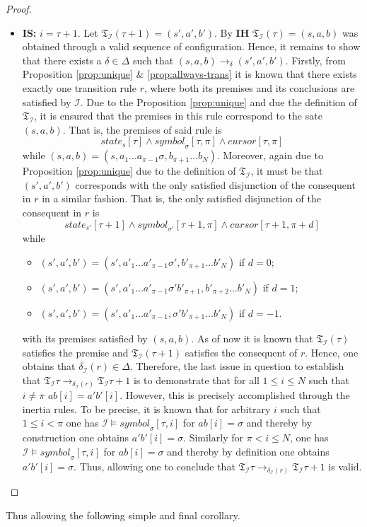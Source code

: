 \documentclass [11pt]{article}
\newcommand{\sym}[3]{\textit{symbol}_{#1}[#2,#3]}
\newcommand{\cursor}[2]{\textit{cursor}[#1,#2]}
\newcommand{\state}[2]{\textit{state}_{#1}[#2]}
\newcommand{\trans}[1]{\mathfrak{T}_{\mathcal{#1}}}
\begin{document}
\begin{proof}
\begin{itemize}
\item \textbf{IS:} $i=\tau+1$. Let $\trans{I}(\tau+1)=(s',a',b')$. By \textbf{IH} $\trans{I}(\tau)=(s,a,b)$ was obtained through a valid sequence of configuration. Hence, it remains to show that there exists a $\delta \in \Delta$ such that 
$(s,a,b) \to_{\delta}(s',a',b')$. Firstly, from Proposition \ref{prop:unique} \& \ref{prop:allways-trans} it is known that there exists exactly one transition rule $r$, where both its premises and its conclusions are satisfied by $\mathcal{I}$. Due to 
the Proposition \ref{prop:unique} and due the definition of $\trans{I}$,  it is ensured that the premises in this rule correspond to the sate $(s,a,b)$. That is, the premises of said rule is
\begin{equation*}
\state{s}{\tau} \wedge \sym{\sigma}{\tau}{\pi} \wedge \cursor{\tau}{\pi}
\end{equation*}
while $(s,a,b)=(s,a_1 \dots a_{\pi-1} \sigma,b_{\pi+1} \dots b_{N})$.
Moreover, again due to Proposition \ref{prop:unique} due to  the definition of $\trans{I}$, it must be that $(s',a',b')$ corresponds with the only satisfied disjunction of the consequent in $r$ in a similar fashion. That is, the only satisfied disjunction of the consequent in $r$ is
\begin{equation*}
\state{s'}{\tau+1} \wedge \sym{\sigma'}{\tau+1}{\pi} \wedge \cursor{\tau+1}{\pi+d}
\end{equation*}
while 
\begin{itemize}
\item $(s',a',b')=(s',a'_1 \dots a'_{\pi-1} \sigma',b'_{\pi+1} \dots b'_{N})$ if $d =0$;
\item  $(s',a',b')=(s',a'_1 \dots a'_{\pi-1} \sigma' b'_{\pi+1} , b'_{\pi+2}\dots b'_{N})$ if $d =1$;
\item  $(s',a',b')=(s',a'_1 \dots a'_{\pi-1} ,\sigma' b'_{\pi+1} \dots b'_{N})$ if $d =-1$.
\end{itemize}
with its premises satisfied by $(s,a,b)$. 
As of now it is known that $\trans{I}(\tau)$ satisfies the premise and $\trans{I}(\tau+1)$ satisfies the consequent of $r$. Hence, one obtains that $\delta_{\mathcal{I}}(r) \in \Delta$. Therefore, the last issue in question to establish that $\trans{I}{\tau} \to_{\delta_{\mathcal{I}}(r)} \trans{I}{\tau+1}$ is to demonstrate that for all $1 \leq i \leq N$ such that  $i \neq \pi$ $ab[i] =a'b'[i]$. However, this is precisely accomplished through the inertia rules. To be precise,  it is known that for arbitrary $i$ such that $1 \leq i < \pi  $ one has 
$\mathcal{I} \models \sym{\sigma}{\tau}{i}$ for $ab[i]=\sigma$ and thereby by construction one obtains $a'b'[i]=\sigma$. Similarly for $\pi  < i \leq N$, one has $\mathcal{I} \models \sym{\sigma}{\tau}{i}$ for $ab[i]=\sigma$ and thereby by definition one obtains $a'b'[i]=\sigma$.
Thus, allowing one to conclude that $\trans{I}{\tau} \to_{\delta_{\mathcal{I}}(r)} \trans{I}{\tau+1}$ is valid.
\end{itemize}
\end{proof}
Thus allowing the following simple and final corollary.
\end{document}
